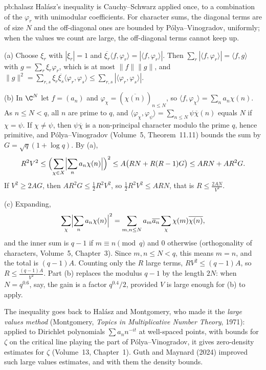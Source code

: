 \begin{solution}{pb:halasz}
\idea Halász's inequality is Cauchy--Schwarz applied once, to a combination of the $\varphi_r$ with unimodular coefficients. For character sums, the diagonal terms are of size $N$
and the off-diagonal ones are bounded by Pólya--Vinogradov, uniformly; when the values we count are large, the off-diagonal terms cannot keep up.

\writeup (a) Choose $\xi_r$ with $|\xi_r|=1$ and $\overline{\xi_r}\langle f,\varphi_r\rangle=|\langle f,\varphi_r\rangle|$. Then
$\sum_r|\langle f,\varphi_r\rangle|=\langle f,g\rangle$ with $g=\sum_r\xi_r\varphi_r$, which is at most $\|f\|\|g\|$, and
$\|g\|^2=\sum_{r,s}\xi_r\overline{\xi_s}\langle\varphi_r,\varphi_s\rangle\le\sum_{r,s}|\langle\varphi_r,\varphi_s\rangle|$.

(b) In $\C^N$ let $f=(a_n)$ and $\varphi_\chi=(\overline{\chi(n)})_{n\le N}$, so $\langle f,\varphi_\chi\rangle=\sum_na_n\chi(n)$. As $n\le N<q$, all $n$ are prime to $q$, and
$\langle\varphi_\chi,\varphi_\psi\rangle=\sum_{n\le N}\psi\overline\chi(n)$ equals $N$ if $\chi=\psi$. If $\chi\ne\psi$, then $\psi\overline\chi$ is a non-principal character modulo the prime $q$, hence
primitive, and Pólya--Vinogradov (Volume~5, Theorem~11.11) bounds the sum by $G=\sqrt q(1+\log q)$. By (a),
\[
R^2V^2\le\Bigl(\sum_{\chi\in X}\Bigl|\sum_na_n\chi(n)\Bigr|\Bigr)^2\le A\bigl(RN+R(R-1)G\bigr)\le ARN+AR^2G.
\]
If $V^2\ge2AG$, then $AR^2G\le\frac12R^2V^2$, so $\frac12R^2V^2\le ARN$, that is $R\le\frac{2AN}{V^2}$.

(c) Expanding,
\[
\sum_\chi\Bigl|\sum_na_n\chi(n)\Bigr|^2=\sum_{m,n\le N}a_m\overline{a_n}\sum_\chi\chi(m)\overline{\chi(n)},
\]
and the inner sum is $q-1$ if $m\equiv n\pmod q$ and $0$ otherwise
(orthogonality of characters, Volume~5, Chapter~3). Since $m,n\le N<q$, this means $m=n$, and the total is $(q-1)A$. Counting only the $R$ large terms,
$RV^2\le(q-1)A$, so $R\le\frac{(q-1)A}{V^2}$. Part (b) replaces the modulus $q-1$ by the length $2N$: when $N=q^{0.6}$, say, the gain is a factor $q^{0.4}/2$, provided $V$ is
large enough for (b) to apply.

\leads The inequality goes back to Halász and Montgomery, who made it the \emph{large values method} (Montgomery, \emph{Topics in Multiplicative Number Theory}, 1971):
applied to Dirichlet polynomials $\sum a_nn^{-it}$ at well-spaced points, with bounds for $\zeta$ on the critical line playing the part of Pólya--Vinogradov, it gives zero-density
estimates for $\zeta$ (Volume~13, Chapter~1). Guth and Maynard (2024) improved such large values estimates, and with them the density bounds.
\end{solution}

